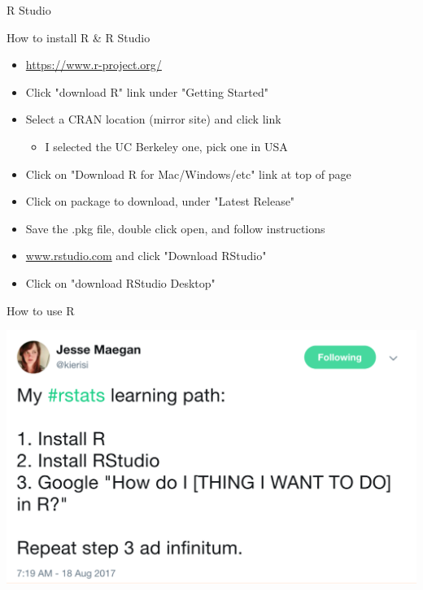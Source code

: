 \documentclass{beamer}
\begin{document}
\begin{frame}{R Studio}
	
	How to install R \& R Studio
	\begin{itemize}
		\item \url{https://www.r-project.org/}
		\item Click "download R" link under "Getting Started"
		\item Select a CRAN location (mirror site) and click link
		      \begin{itemize}
		      	\item I selected the UC Berkeley one, pick one in USA
		      \end{itemize}
		\item Click on "Download R for Mac/Windows/etc" link at top of page
		\item Click on package to download, under "Latest Release"
		\item Save the .pkg file, double click open, and follow instructions 
		\item \url{www.rstudio.com} and click "Download RStudio"
		\item Click on "download RStudio Desktop"
	\end{itemize}
	
\end{frame}


\begin{frame}{How to use R}
	\begin{center}
		\includegraphics[width=\linewidth]{r.png}
	\end{center}
\end{frame}


\end{document}
